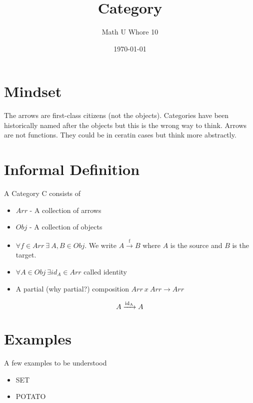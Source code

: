 \documentclass[a4paper]{scrartcl}
\title{Category}
\author{Math U Whore 10}
\date{\today}
\begin{document}
\maketitle
\section{Mindset}
The arrows are first-class citizens (not the objects). Categories have been historically named after the objects but this is the wrong way to think. Arrows are not functions. They could be in ceratin cases but think more abstractly.
\section{Informal Definition}
A Category C consists of
\begin{itemize}
\item{$Arr$ - A collection of arrows}
\item{$Obj$ - A collection of objects}
\item{$\forall f\in Arr\ \exists\ A, B \in Obj$. We write
$A \xrightarrow{\text{f}} B$ where $A$ is the source and $B$ is the target. }
\item{$\forall A\in Obj\ \exists id_{A}\in Arr$ called identity}
\item{A partial (why partial?) composition $Arr\ x\ Arr \rightarrow Arr$}
\end{itemize}

$$A \xrightarrow{\text{id\textsubscript{A}}} A$$

\section{Examples}
A few examples to be understood
\begin{itemize}
\item{SET}
\item{POTATO}
\end{itemize}
\end{document}
